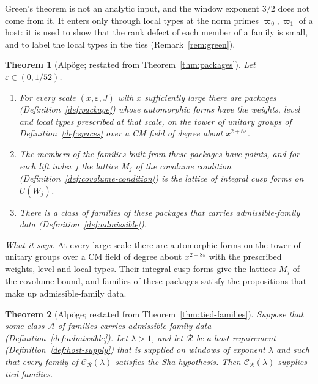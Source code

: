 \documentclass[11pt]{amsbook}
\theoremstyle{plain}
\newtheorem{theorem}{Theorem}[section]
\theoremstyle{definition}
\theoremstyle{remark}
\numberwithin{equation}{section}
\numberwithin{figure}{chapter}
\numberwithin{table}{chapter}
\newcommand{\eps}{\varepsilon}
\begin{document}
\noindent Green's theorem is not an analytic input, and the window
exponent $3/2$ does not come from it. It enters only through local
types at the norm primes $\varpi_0,\varpi_1$ of a host: it is used
to show that the rank defect of each
member of a family is small, and to label the local types in the ties
(Remark~\ref{rem:green}).

\begin{theorem}[Alp\"oge; restated from Theorem~\ref{thm:packages}]
\label{bb:packages}
Let $\eps\in(0,1/52)$.
\begin{enumerate}[label=(\alph*)]
\item For every scale $(x,\eps,J)$ with
$x$ sufficiently large there are packages
(Definition~\ref{def:package}) whose automorphic forms have the
weights, level and local types prescribed at that scale, on the tower
of unitary groups of Definition~\ref{def:spaces} over a CM field of
degree about $x^{2+8\eps}$.
\item The members of the families built
from these packages have points, and for each lift index $j$ the
lattice $M_j$ of the covolume condition
(Definition~\ref{def:covolume-condition}) is the lattice of integral
cusp forms on $U(W_j)$.
\item There is a class of families of
these packages that carries admissible-family data
(Definition~\ref{def:admissible}).
\end{enumerate}
\end{theorem}

\noindent\emph{What it says.} At every large scale there are
automorphic forms on the tower of unitary groups over a CM field of
degree about $x^{2+8\eps}$ with the prescribed weights, level and
local types. Their integral cusp forms give the lattices $M_j$ of the
covolume bound, and families of these packages satisfy the
propositions that make up admissible-family data.

\begin{theorem}[Alp\"oge; restated from Theorem~\ref{thm:tied-families}]
\label{bb:tied-families}
Suppose that some class $\mathcal A$ of families carries
admissible-family data (Definition~\ref{def:admissible}). Let
$\lambda>1$, and let $\mathscr R$ be a host requirement
(Definition~\ref{def:host-supply}) that is supplied on windows of
exponent $\lambda$ and such that every family of
$\mathcal C_{\mathscr R}(\lambda)$ satisfies the Sha hypothesis. Then
$\mathcal C_{\mathscr R}(\lambda)$ supplies tied families.
\end{theorem}
\end{document}
